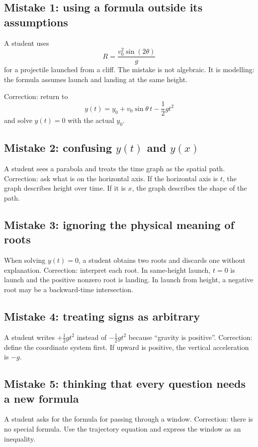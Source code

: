 \documentclass[11pt,a4paper]{article}
\begin{document}
\subsection{Mistake 1: using a formula outside its assumptions}

A student uses
\[
R=\frac{v_0^2\sin(2\theta)}{g}
\]
for a projectile launched from a cliff. The mistake is not algebraic. It is modelling: the formula assumes launch and landing at the same height.

Correction: return to
\[
y(t)=y_0+v_0\sin\theta\,t-\frac12gt^2
\]
and solve $y(t)=0$ with the actual $y_0$.

\subsection{Mistake 2: confusing $y(t)$ and $y(x)$}

A student sees a parabola and treats the time graph as the spatial path. Correction: ask what is on the horizontal axis. If the horizontal axis is $t$, the graph describes height over time. If it is $x$, the graph describes the shape of the path.

\subsection{Mistake 3: ignoring the physical meaning of roots}

When solving $y(t)=0$, a student obtains two roots and discards one without explanation. Correction: interpret each root. In same-height launch, $t=0$ is launch and the positive nonzero root is landing. In launch from height, a negative root may be a backward-time intersection.

\subsection{Mistake 4: treating signs as arbitrary}

A student writes $+\frac12gt^2$ instead of $-\frac12gt^2$ because ``gravity is positive''. Correction: define the coordinate system first. If upward is positive, the vertical acceleration is $-g$.

\subsection{Mistake 5: thinking that every question needs a new formula}

A student asks for the formula for passing through a window. Correction: there is no special formula. Use the trajectory equation and express the window as an inequality.
\end{document}
